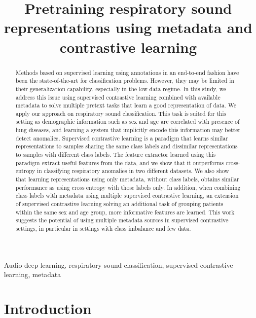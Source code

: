 \documentclass{article}
\title{Pretraining respiratory sound representations using metadata and contrastive learning}
\begin{document}
\ninept
\maketitle

\begin{sloppy}

\begin{abstract}
Methods based on supervised learning using annotations in an end-to-end fashion have been the state-of-the-art for classification problems. However, they may be limited in their generalization capability, especially in the low data regime. In this study, we address this issue using supervised contrastive learning combined with available metadata to solve multiple pretext tasks that learn a good representation of data. We apply our approach on respiratory sound classification. This task is suited for this setting as demographic information such as sex and age are correlated with presence of lung diseases, and learning a system that implicitly encode this information may better detect anomalies. Supervised contrastive learning is a paradigm that learns similar representations to samples sharing the same class labels and dissimilar representations to samples with different class labels. The feature extractor learned using this paradigm extract useful features from the data, and we show that it outperforms cross-entropy in classifying respiratory anomalies in two different datasets. We also show that learning representations using only metadata, without class labels, obtains similar performance as using cross entropy with those labels only. In addition, when combining class labels with metadata using multiple supervised contrastive learning, an extension of supervised contrastive learning solving an additional task of grouping patients within the same sex and age group, more informative features are learned. This work suggests the potential of using multiple metadata sources in supervised contrastive settings, in particular in settings with class imbalance and few data.
\end{abstract}

\begin{keywords}
Audio deep learning, respiratory sound classification, supervised contrastive learning, metadata
\end{keywords}

\section{Introduction}
\label{sec:intro}


\end{sloppy}
\end{document}
